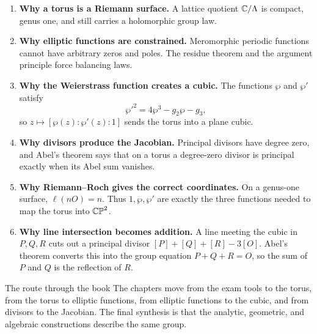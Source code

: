 \begin{enumerate}
\item \textbf{Why a torus is a Riemann surface.}
  A lattice quotient \(\mathbb{C}/\Lambda\) is compact, genus one, and still carries a
  holomorphic group law.

\item \textbf{Why elliptic functions are constrained.}
  Meromorphic periodic functions cannot have arbitrary zeros and poles.  The
  residue theorem and the argument principle force balancing laws.

\item \textbf{Why the Weierstrass function creates a cubic.}
  The functions \(\wp\) and \(\wp'\) satisfy
  \[
    \wp'^2=4\wp^3-g_2\wp-g_3,
  \]
  so \(z\mapsto[\wp(z):\wp'(z):1]\) sends the torus into a plane cubic.

\item \textbf{Why divisors produce the Jacobian.}
  Principal divisors have degree zero, and Abel's theorem says that on a torus a
  degree-zero divisor is principal exactly when its Abel sum vanishes.

\item \textbf{Why Riemann--Roch gives the correct coordinates.}
  On a genus-one surface, \(\ell(nO)=n\).  Thus \(1,\wp,\wp'\) are exactly the
  three functions needed to map the torus into \(\mathbb{CP}^2\).

\item \textbf{Why line intersection becomes addition.}
  A line meeting the cubic in \(P,Q,R\) cuts out a principal divisor
  \([P]+[Q]+[R]-3[O]\).  Abel's theorem converts this into the group equation
  \(P+Q+R=O\), so the sum of \(P\) and \(Q\) is the reflection of \(R\).
\end{enumerate}

\begin{keyidea}{The route through the book}
The chapters move from the exam tools to the torus, from the torus to elliptic
functions, from elliptic functions to the cubic, and from divisors to the
Jacobian.  The final synthesis is that the analytic, geometric, and algebraic
constructions describe the same group.
\end{keyidea}
